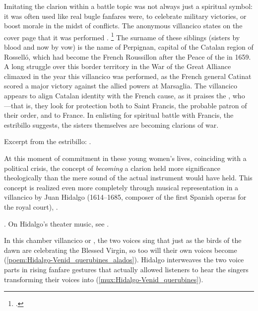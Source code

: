 Imitating the clarion within a battle topic was not always just a spiritual
symbol: it was often used like real bugle fanfares were, to celebrate military
victories, or boost morale in the midst of conflicts.
The anonymous villancico  states on the cover
page that it was performed .%
    \footnote{.}
The surname of these siblings (sisters by blood and now by vow) is the name of
Perpignan, capital of the Catalan region of Rosselló, which had become the
French Roussillon after the Peace of the \XXX[Pyrennees] in 1659.
A long struggle over this border territory in the War of the Great Alliance
climaxed in the year this villancico was performed, as the French general
Catinat scored a major victory against the allied powers at Marsaglia.%
    \citXXX[history]
The villancico appears to align Catalan identity with the French cause, as it
praises the , who
---that is,
they look for protection both to Saint Francis, the probable patron of their
order, and to France.
In enlisting for spiritual battle with Francis, the estribillo suggests, the
sisters themselves are becoming clarions of war.%
\begin{Footnote}
    Excerpt from the estribillo: 
    .
\end{Footnote}

At this moment of commitment in these young women's lives, coinciding with a
political crisis, the concept of \emph{becoming} a clarion held more
significance theologically than the mere sound of the actual instrument would
have held.
This concept is realized even more completely through musical representation in
a villancico by Juan Hidalgo (1614--1685, composer of the first Spanish operas
for the royal court), .%
\begin{Footnote}
    . 
    On Hidalgo's theater music, see \citXXX[Stein].
\end{Footnote}
In this chamber villancico or , the two voices sing that just
as the birds of the dawn are  celebrating the Blessed Virgin, so
too will their own voices become 
(\cref{poem:Hidalgo-Venid_querubines_alados}).
Hidalgo interweaves the two voice parts in rising fanfare gestures that
actually allowed listeners to hear the singers transforming their voices into
 (\cref{mux:Hidalgo-Venid_querubines}).


